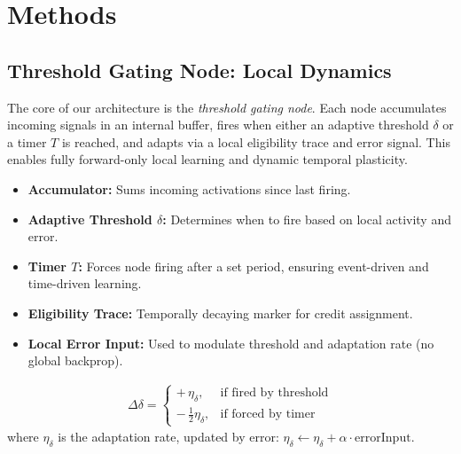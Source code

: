 \documentclass[11pt]{article}
\begin{document}
\section{Methods}

\subsection{Threshold Gating Node: Local Dynamics}

The core of our architecture is the \emph{threshold gating node}. Each node accumulates incoming signals in an internal buffer, fires when either an adaptive threshold $\delta$ or a timer $T$ is reached, and adapts via a local eligibility trace and error signal. This enables fully forward-only local learning and dynamic temporal plasticity.

\begin{itemize}
    \item \textbf{Accumulator:} Sums incoming activations since last firing.
    \item \textbf{Adaptive Threshold $\delta$:} Determines when to fire based on local activity and error.
    \item \textbf{Timer $T$:} Forces node firing after a set period, ensuring event-driven and time-driven learning.
    \item \textbf{Eligibility Trace:} Temporally decaying marker for credit assignment.
    \item \textbf{Local Error Input:} Used to modulate threshold and adaptation rate (no global backprop).
\end{itemize}

\begin{align}
\Delta \delta =
\begin{cases}
+\,\eta_{\delta}, & \text{if fired by threshold} \\
-\,\frac{1}{2}\eta_{\delta}, & \text{if forced by timer}
\end{cases}
\end{align}
where $\eta_{\delta}$ is the adaptation rate, updated by error: $\eta_{\delta} \leftarrow \eta_{\delta} + \alpha \cdot \text{errorInput}$.
\end{document}
